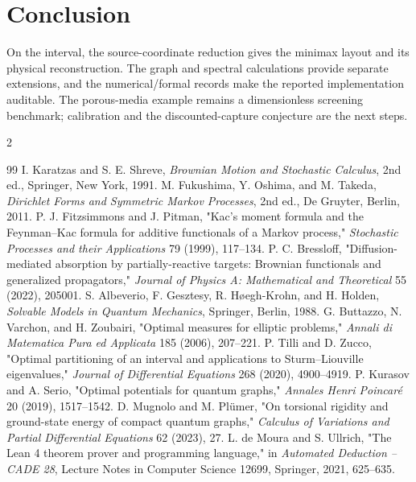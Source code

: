 \documentclass[10pt]{article}
\begin{document}
\section*{Conclusion}

On the interval, the source-coordinate reduction gives the minimax layout and its physical reconstruction. The graph and spectral calculations provide separate extensions, and the numerical/formal records make the reported implementation auditable. The porous-media example remains a dimensionless screening benchmark; calibration and the discounted-capture conjecture are the next steps.

\begin{multicols}{2}
\begin{thebibliography}{99}
\scriptsize
{} I. Karatzas and S. E. Shreve, \emph{Brownian Motion and Stochastic Calculus}, 2nd ed., Springer, New York, 1991.
 M. Fukushima, Y. Oshima, and M. Takeda, \emph{Dirichlet Forms and Symmetric Markov Processes}, 2nd ed., De Gruyter, Berlin, 2011.
 P. J. Fitzsimmons and J. Pitman, "Kac's moment formula and the Feynman--Kac formula for additive functionals of a Markov process," \emph{Stochastic Processes and their Applications} 79 (1999), 117--134.
 P. C. Bressloff, "Diffusion-mediated absorption by partially-reactive targets: Brownian functionals and generalized propagators," \emph{Journal of Physics A: Mathematical and Theoretical} 55 (2022), 205001.
 S. Albeverio, F. Gesztesy, R. H{\o}egh-Krohn, and H. Holden, \emph{Solvable Models in Quantum Mechanics}, Springer, Berlin, 1988.
 G. Buttazzo, N. Varchon, and H. Zoubairi, "Optimal measures for elliptic problems," \emph{Annali di Matematica Pura ed Applicata} 185 (2006), 207--221.
 P. Tilli and D. Zucco, "Optimal partitioning of an interval and applications to Sturm--Liouville eigenvalues," \emph{Journal of Differential Equations} 268 (2020), 4900--4919.
 P. Kurasov and A. Serio, "Optimal potentials for quantum graphs," \emph{Annales Henri Poincar{\'e}} 20 (2019), 1517--1542.
 D. Mugnolo and M. Pl{\"u}mer, "On torsional rigidity and ground-state energy of compact quantum graphs," \emph{Calculus of Variations and Partial Differential Equations} 62 (2023), 27.
 L. de Moura and S. Ullrich, "The Lean 4 theorem prover and programming language," in \emph{Automated Deduction -- CADE 28}, Lecture Notes in Computer Science 12699, Springer, 2021, 625--635.

\end{thebibliography}
\end{multicols}
\end{document}
